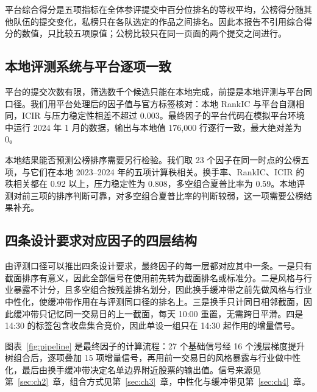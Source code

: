 \documentclass[UTF8,a4paper,zihao=-4,fontset=none]{ctexart}
\begin{document}
平台综合得分是五项指标在全体参评提交中百分位排名的等权平均，公榜得分随其他队伍的提交变化，私榜只在各队选定的作品之间排名。因此本报告不引用综合得分的数值，只比较五项原值；公榜比较只在同一页面的两个提交之间进行。

\subsection{本地评测系统与平台逐项一致}\label{sec:local}

平台的提交次数有限，筛选数千个候选只能在本地完成，前提是本地评测与平台同口径。我们用平台处理后的因子值与官方标签核对：本地 RankIC 与平台自测相同，ICIR 与压力稳定性相差不超过 0.003。最终因子的平台代码在模拟平台环境中运行 2024 年 1 月的数据，输出与本地值 176,000 行逐行一致，最大绝对差为 0。

本地结果能否预测公榜排序需要另行检验。我们取 23 个因子在同一时点的公榜五项，与它们在本地 2023–2024 年的五项计算秩相关。换手率、RankIC、ICIR 的秩相关都在 0.92 以上，压力稳定性为 0.808，多空组合夏普比率为 0.59。本地评测对前三项的排序判断可靠，对多空组合夏普比率的判断较弱，这一项需要公榜结果补充。


\subsection{四条设计要求对应因子的四层结构}\label{sec:design}

由评测口径可以推出四条设计要求，最终因子的每一层都对应其中一条。一是只有截面排序有意义，因此全部信号在使用前先转为截面排名或标准分。二是风格与行业暴露不计分，且多空组合按残差排名划分，因此换手缓冲带之前先做风格与行业中性化，使缓冲带作用在与评测同口径的排名上。三是换手只计同日相邻截面，因此缓冲带只记忆同一交易日的上一截面，每天 10:00 重置，无需跨日平滑。四是 14:30 的标签包含收盘集合竞价，因此单设一组只在 14:30 起作用的增量信号。

图表~\ref{fig:pipeline} 是最终因子的计算流程：27 个基础信号经 16 个浅层梯度提升树组合后，逐项叠加 15 项增量信号，再用前一交易日的风格暴露与行业做中性化，最后由换手缓冲带决定名单边界附近股票的输出值。信号来源见第~\ref{sec:ch2}~章，组合方式见第~\ref{sec:ch3}~章，中性化与缓冲带见第~\ref{sec:ch4}~章。
\end{document}
